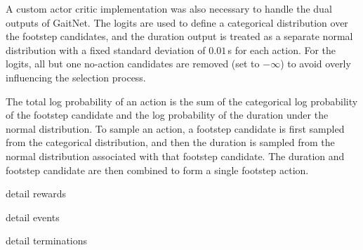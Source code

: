 A custom actor critic implementation was also necessary to handle the
dual outputs of GaitNet. The logits are used to define a categorical
distribution over the footstep candidates, and the duration output is
treated as a separate normal distribution with a fixed standard deviation
of $0.01$\,s for each action. For the logits, all but one no-action candidates
are removed (set to $-\infty$) to avoid overly influencing the
selection process.

The total log probability of an action is the sum of
the categorical log probability of the footstep candidate and the
log probability of the duration under the normal distribution.
To sample an action, a footstep candidate is first sampled from the categorical
distribution, and then the duration is sampled from the normal
distribution associated with that footstep candidate. The duration
and footstep candidate
are then combined to form a single footstep action.

\begin{todo}
  detail rewards
\end{todo}

\begin{todo}
  detail events
\end{todo}

\begin{todo}
  detail terminations
\end{todo}
